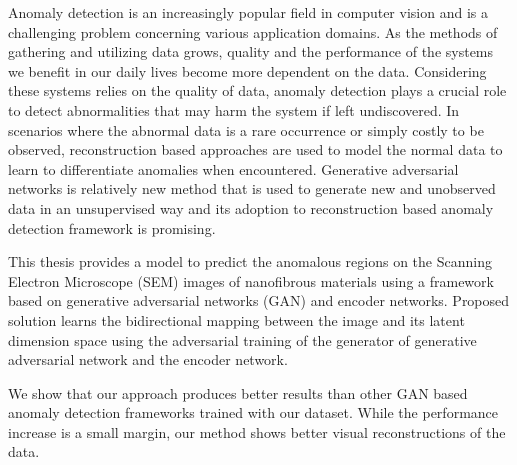 
\begingroup

Anomaly detection is an increasingly popular field in computer vision and is a challenging 
problem concerning various application domains. As the methods of gathering and utilizing 
data grows, quality and the performance of the systems we benefit in our daily lives become
more dependent on the data. Considering these systems relies on the quality of data, anomaly detection 
plays a crucial role to detect abnormalities that may harm the system if left undiscovered. In scenarios where 
the abnormal data is a rare occurrence or simply costly to be observed, reconstruction based approaches 
are used to model the normal data to learn to differentiate anomalies when encountered. Generative adversarial 
networks is relatively new method that is used to generate new and unobserved data in an unsupervised way and 
its adoption to reconstruction based anomaly detection framework is promising.

This thesis provides a model to predict the anomalous regions on the Scanning Electron Microscope (SEM) images 
of nanofibrous materials using a framework based on generative adversarial networks (GAN) and encoder networks. 
Proposed solution learns the bidirectional mapping between the image and its latent dimension space using the adversarial 
training of the generator of generative adversarial network and the encoder network. 

We show that our approach produces better results than other GAN based anomaly detection frameworks trained with our 
dataset. While the performance increase is a small margin, our method shows better visual reconstructions of the data.
\endgroup